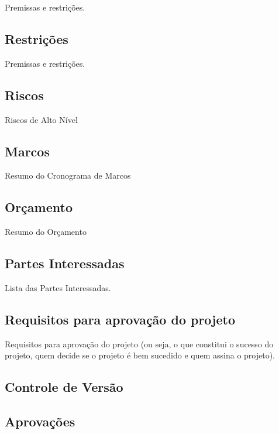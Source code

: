 Premissas e restrições.

\subsection{Restrições}

Premissas e restrições.

\subsection{Riscos}

Riscos de Alto Nível

\subsection{Marcos}

Resumo do Cronograma de Marcos

\subsection{Orçamento}

Resumo do Orçamento

\subsection{Partes Interessadas}

Lista das Partes Interessadas.

\subsection{Requisitos para aprovação do projeto}

Requisitos para aprovação do projeto (ou seja, o que constitui o sucesso do projeto, quem decide se
o projeto é bem sucedido e quem assina o projeto).

\subsection{Controle de Versão}

\subsection{Aprovações}

